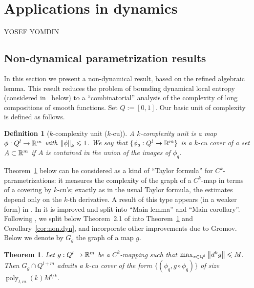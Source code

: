 \documentclass[reqno]{amsart}
\newtheorem{Thm}{Theorem}{\bfseries}{\itshape}
\newtheorem{Def}[Cor]{Definition}{\bfseries}{\rmfamily}
\renewcommand\~[1]{\widetilde{#1}}
\def\poly{\operatorname{poly}} \def\J{\operatorname{J}}
\begin{document}
\section{Applications in dynamics}
\begin{center}
  \footnotesize YOSEF YOMDIN
\end{center}
\label{appendix:yomdin}

\subsection{Non-dynamical parametrization results}
\label{Sec:Non.Dyn}

In this section we present a non-dynamical result, based on the
refined algebraic lemma. This result reduces the problem of bounding
dynamical local entropy (considered in~ below) to
a ``combinatorial'' analysis of the complexity of long compositions of
smooth functions. Set $Q:=[0,1]$. Our basic unit of complexity is
defined as follows.

\begin{Def}[$k$-complexity unit ($k$-cu)]
  A $k$-complexity unit is a map $\phi:Q^l\to{\mathbb R}^m$ with
  $\left\Vert \phi \right\Vert_k\leqslant1$. We say that $\{\phi_q:Q^l\to{\mathbb R}^m\}$ is a $k$-cu
  cover of a set $A\subset{\mathbb R}^m$ if $A$ is contained in the union of
  the images of $\phi_q$.
\end{Def}

Theorem~\ref{thm:non.dyn} below can be considered as a kind of
``Taylor formula'' for $C^k$-parametrizations: it measures the
complexity of the graph of a $C^k$-map in terms of a covering by
$k$-cu's; exactly as in the usual Taylor formula, the estimates depend
only on the $k$-th derivative. A result of this type appears (in a
weaker form) in \cite[Theorem~2.1]{yomdin:entropy}. In
\cite{gromov:gy} it is improved and split into ``Main lemma'' and
``Main corollary''. Following \cite{gromov:gy}, we split below
Theorem~2.1 of \cite{yomdin:entropy} into Theorem~\ref{thm:non.dyn}
and Corollary~\ref{cor:non.dyn}, and incorporate other improvements
due to Gromov. Below we denote by $G_g$ the graph of a map $g$.

\begin{Thm}\label{thm:non.dyn}
  Let $g:Q^l\to{\mathbb R}^m$ be a $C^k$-mapping such that
  $\max_{x\in Q^l}\left\Vert d^kg \right\Vert\leqslant M.$ Then $G_g\cap Q^{l+m}$ admits a
  $k$-cu cover of the form $\{(\phi_q,g\circ\phi_q)\}$ of size
  $\poly_{l,m}(k)M^{l/k}$.
\end{Thm}
\end{document}
